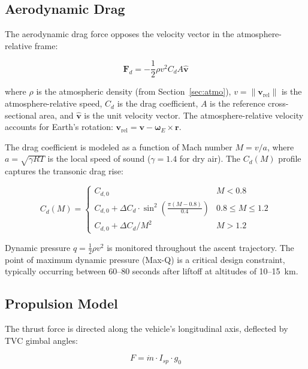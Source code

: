 \documentclass[conference]{IEEEtran}
\newcommand{\vect}[1]{\boldsymbol{#1}}
\begin{document}
\subsection{Aerodynamic Drag}
\label{sec:aero}

The aerodynamic drag force opposes the velocity vector in the atmosphere-relative frame:

\begin{equation}
    \vect{F}_d = -\frac{1}{2} \rho v^2 C_d A \hat{\vect{v}}
    \label{eq:drag}
\end{equation}

\noindent where $\rho$ is the atmospheric density (from Section~\ref{sec:atmo}), $v = \|\vect{v}_{\text{rel}}\|$ is the atmosphere-relative speed, $C_d$ is the drag coefficient, $A$ is the reference cross-sectional area, and $\hat{\vect{v}}$ is the unit velocity vector. The atmosphere-relative velocity accounts for Earth's rotation: $\vect{v}_{\text{rel}} = \vect{v} - \vect{\omega}_E \times \vect{r}$.

The drag coefficient is modeled as a function of Mach number $M = v / a$, where $a = \sqrt{\gamma R T}$ is the local speed of sound ($\gamma = 1.4$ for dry air). The $C_d(M)$ profile captures the transonic drag rise:

\begin{equation}
    C_d(M) = \begin{cases}
        C_{d,0} & M < 0.8 \\
        C_{d,0} + \Delta C_d \cdot \sin^2\!\left(\frac{\pi(M - 0.8)}{0.4}\right) & 0.8 \leq M \leq 1.2 \\
        C_{d,0} + \Delta C_d / M^2 & M > 1.2
    \end{cases}
    \label{eq:cd_mach}
\end{equation}

Dynamic pressure $q = \frac{1}{2}\rho v^2$ is monitored throughout the ascent trajectory. The point of maximum dynamic pressure (Max-Q) is a critical design constraint, typically occurring between 60--80 seconds after liftoff at altitudes of 10--15~km.

\subsection{Propulsion Model}
\label{sec:propulsion}

The thrust force is directed along the vehicle's longitudinal axis, deflected by TVC gimbal angles:

\begin{equation}
    F = \dot{m} \cdot I_{sp} \cdot g_0
    \label{eq:thrust}
\end{equation}
\end{document}
